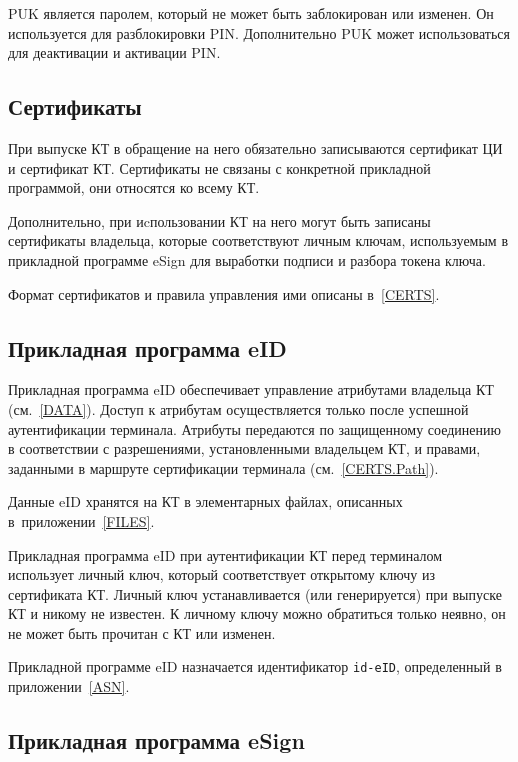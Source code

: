 PUK является паролем, который не может быть заблокирован или изменен. 
Он используется для разблокировки 
PIN. Дополнительно PUK может использоваться для деактивации и активации PIN. 

\subsection{Сертификаты}\label{OBJ.Certs}

При выпуске КТ в обращение на него обязательно записываются сертификат 
ЦИ и сертификат КТ. 
Сертификаты не связаны с конкретной 
прикладной программой, они относятся ко всему КТ. 

Дополнительно, при иcпользовании КТ на него могут быть записаны
сертификаты владельца, которые соответствуют личным ключам, используемым
в прикладной программе eSign для выработки подписи и разбора токена ключа.


Формат сертификатов и правила управления ими описаны в~\ref{CERTS}.

\subsection{Прикладная программа eID}\label{OBJ.eID}

Прикладная программа eID обеспечивает управление атрибутами владельца КТ 
(см.~\ref{DATA}). Доступ к атрибутам 
осуществляется только после успешной аутентификации терминала. Атрибуты 
передаются по защищенному соединению в соответствии с разрешениями, 
установленными владельцем КТ, и правами, заданными в маршруте сертификации 
терминала (см.~\ref{CERTS.Path}).  

Данные eID хранятся на КТ в элементарных файлах, описанных в~приложении~\ref{FILES}.

Прикладная программа eID при аутентификации КТ перед терминалом использует личный 
ключ, который соответствует открытому ключу из сертификата КТ. 
Личный ключ устанавливается (или генерируется) при выпуске КТ и никому не 
известен. К личному ключу можно обратиться только неявно, он не может быть 
прочитан с КТ или изменен. 

Прикладной программе eID назначается идентификатор \verb|id-eID|, 
определенный в приложении~\ref{ASN}. 

\subsection{Прикладная программа eSign}\label{OBJ.eSign}

